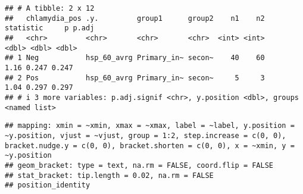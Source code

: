 \documentclass[
]{article}
\newenvironment{Shaded}{\begin{snugshade}}{\end{snugshade}}
\newcommand{\AttributeTok}[1]{\textcolor[rgb]{0.77,0.63,0.00}{#1}}
\newcommand{\CommentTok}[1]{\textcolor[rgb]{0.56,0.35,0.01}{\textit{#1}}}
\newcommand{\ConstantTok}[1]{\textcolor[rgb]{0.00,0.00,0.00}{#1}}
\newcommand{\DecValTok}[1]{\textcolor[rgb]{0.00,0.00,0.81}{#1}}
\newcommand{\FloatTok}[1]{\textcolor[rgb]{0.00,0.00,0.81}{#1}}
\newcommand{\FunctionTok}[1]{\textcolor[rgb]{0.00,0.00,0.00}{#1}}
\newcommand{\NormalTok}[1]{#1}
\newcommand{\OtherTok}[1]{\textcolor[rgb]{0.56,0.35,0.01}{#1}}
\newcommand{\SpecialCharTok}[1]{\textcolor[rgb]{0.00,0.00,0.00}{#1}}
\newcommand{\StringTok}[1]{\textcolor[rgb]{0.31,0.60,0.02}{#1}}
\begin{document}
\begin{verbatim}
## # A tibble: 2 x 12
##   chlamydia_pos .y.         group1      group2    n1    n2 statistic     p p.adj
##   <chr>         <chr>       <chr>       <chr>  <int> <int>     <dbl> <dbl> <dbl>
## 1 Neg           hsp_60_avrg Primary_in~ secon~    40    60      1.16 0.247 0.247
## 2 Pos           hsp_60_avrg Primary_in~ secon~     5     3      1.04 0.297 0.297
## # i 3 more variables: p.adj.signif <chr>, y.position <dbl>, groups <named list>
\end{verbatim}

\begin{Shaded}
\end{Shaded}

\begin{verbatim}
## mapping: xmin = ~xmin, xmax = ~xmax, label = ~label, y.position = ~y.position, vjust = ~vjust, group = 1:2, step.increase = c(0, 0), bracket.nudge.y = c(0, 0), bracket.shorten = c(0, 0), x = ~xmin, y = ~y.position 
## geom_bracket: type = text, na.rm = FALSE, coord.flip = FALSE
## stat_bracket: tip.length = 0.02, na.rm = FALSE
## position_identity
\end{verbatim}
\end{document}
